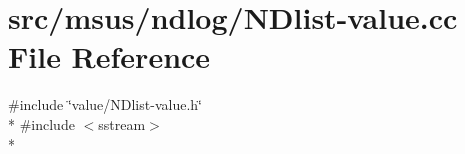 \hypertarget{_n_dlist-value_8cc}{\section{src/msus/ndlog/\-N\-Dlist-\/value.cc File Reference}
\label{_n_dlist-value_8cc}
}
{\ttfamily \#include \char`\"{}value/\-N\-Dlist-\/value.\-h\char`\"{}}\\*
{\ttfamily \#include $<$sstream$>$}\\*
